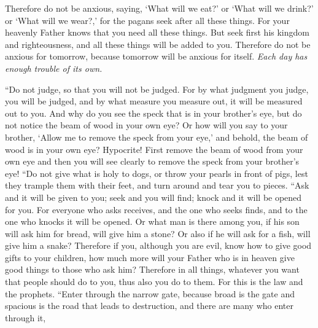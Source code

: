 \begin{biblechapter}
\verse Therefore do not be anxious, saying, ‘What will we eat?’ or ‘What will we drink?’ or ‘What will we wear?,’
\verse for the pagans seek after all these things. For your heavenly Father knows that you need all these things.
\verse But seek first his kingdom and righteousness, and all these things will be added to you.
\verse Therefore do not be anxious for tomorrow, because tomorrow will be anxious for itself. \textit{Each day has enough trouble of its own.}
\end{biblechapter}

\begin{biblechapter} %
 “Do not judge, so that you will not be judged.
\verse For by what judgment you judge, you will be judged, and by what measure you measure out, it will be measured out to you.
\verse And why do you see the speck that is in your brother’s eye, but do not notice the beam of wood in your own eye?
\verse Or how will you say to your brother, ‘Allow me to remove the speck from your eye,’ and behold, the beam of wood is in your own eye?
\verse Hypocrite! First remove the beam of wood from your own eye and then you will see clearly to remove the speck from your brother’s eye!
\verse “Do not give what is holy to dogs, or throw your pearls in front of pigs, lest they trample them with their feet, and turn around and tear you to pieces.
 “Ask and it will be given to you; seek and you will find; knock and it will be opened for you.
\verse For everyone who asks receives, and the one who seeks finds, and to the one who knocks it will be opened.
\verse Or what man is there among you, if his son will ask him for bread, will give him a stone?
\verse Or also if he will ask for a fish, will give him a snake?
\verse Therefore if you, although you are evil, know how to give good gifts to your children, how much more will your Father who is in heaven give good things to those who ask him?
\verse Therefore in all things, whatever you want that people should do to you, thus also you do to them. For this is the law and the prophets.
 “Enter through the narrow gate, because broad is the gate and spacious is the road that leads to destruction, and there are many who enter through it,

\end{biblechapter}
